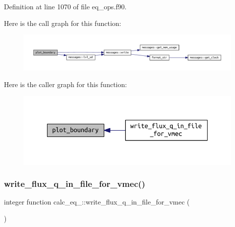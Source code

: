 Definition at line 1070 of file eq\+\_\+ops.\+f90.

Here is the call graph for this function\+:
\nopagebreak
\begin{figure}[H]
\begin{center}
\leavevmode
\includegraphics[width=350pt]{eq__ops_8f90_a627b6dce4cc49504cdcb156e0179f24d_cgraph}
\end{center}
\end{figure}
Here is the caller graph for this function\+:
\nopagebreak
\begin{figure}[H]
\begin{center}
\leavevmode
\includegraphics[width=348pt]{eq__ops_8f90_a627b6dce4cc49504cdcb156e0179f24d_icgraph}
\end{center}
\end{figure}
\mbox{\label{eq__ops_8f90_aecc1d4103aa82217d3014ebb09d7f1e5}} 
\subsubsection{\texorpdfstring{write\+\_\+flux\+\_\+q\+\_\+in\+\_\+file\+\_\+for\+\_\+vmec()}{write\_flux\_q\_in\_file\_for\_vmec()}}
{\footnotesize\ttfamily integer function calc\+\_\+eq\+\_\+::write\+\_\+flux\+\_\+q\+\_\+in\+\_\+file\+\_\+for\+\_\+vmec (\begin{DoxyParamCaption}{ }\end{DoxyParamCaption})}



